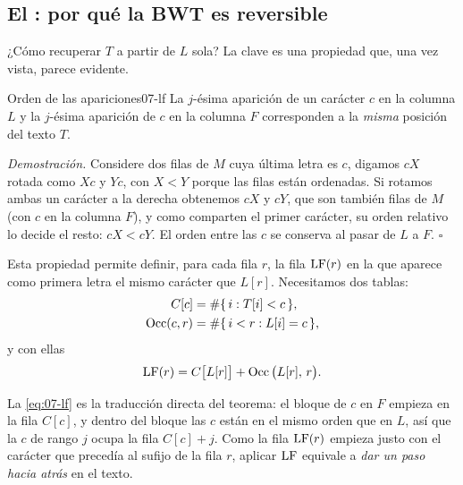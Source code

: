 \subsection{El : por qué la BWT es reversible}

¿Cómo recuperar $T$ a partir de $L$ sola? La clave es una propiedad que, una vez vista, parece evidente.

\begin{teorema}{Orden de las apariciones}{07-lf}
La $j$-ésima aparición de un carácter $c$ en la columna $L$ y la $j$-ésima aparición de $c$ en la columna $F$ corresponden a la \emph{misma} posición del texto $T$.
\end{teorema}

\noindent\textit{Demostración.} Considere dos filas de $M$ cuya última letra es $c$, digamos $cX$ rotada como $X c$ y $Y c$, con $X<Y$ porque las filas están ordenadas. Si rotamos ambas un carácter a la derecha obtenemos $cX$ y $cY$, que son también filas de $M$ (con $c$ en la columna $F$), y como comparten el primer carácter, su orden relativo lo decide el resto: $cX<cY$. El orden entre las $c$ se conserva al pasar de $L$ a $F$. \hfill$\square$

Esta propiedad permite definir, para cada fila $r$, la fila $\operatorname{LF}(r)$ en la que aparece como primera letra el mismo carácter que $L[r]$. Necesitamos dos tablas:
\begin{align}
C[c] &= \#\{\,i : T[i] < c\,\},\label{eq:07-C}\\
\operatorname{Occ}(c, r) &= \#\{\,i < r : L[i] = c\,\},\label{eq:07-occ}
\end{align}
y con ellas
\begin{equation}\label{eq:07-lf}
\operatorname{LF}(r) = C\big[L[r]\big] + \operatorname{Occ}\big(L[r],\, r\big).
\end{equation}

\begin{simbolos}
\end{simbolos}

La \cref{eq:07-lf} es la traducción directa del teorema: el bloque de $c$ en $F$ empieza en la fila $C[c]$, y dentro del bloque las $c$ están en el mismo orden que en $L$, así que la $c$ de rango $j$ ocupa la fila $C[c]+j$. Como la fila $\operatorname{LF}(r)$ empieza justo con el carácter que precedía al sufijo de la fila $r$, aplicar $\operatorname{LF}$ equivale a \emph{dar un paso hacia atrás} en el texto.

